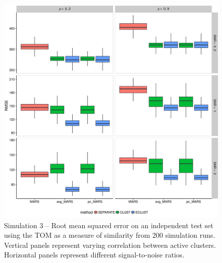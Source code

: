 \begin{appendices}
\begin{figure}[H]
	\centering
	\includegraphics[scale=0.6, keepaspectratio]{./figs/hydra/results/figures/sim3-sept27/RMSE_TOM_sim3.png}
	\caption{Simulation 3 -- Root mean squared error on an independent test set using the TOM as a measure of similarity from 200 simulation runs. Vertical panels represent varying correlation between active clusters. Horizontal panels represent different signal-to-noise ratios.}
	\label{fig:RMSE_TOM_sim3}
\end{figure}


\end{appendices}
